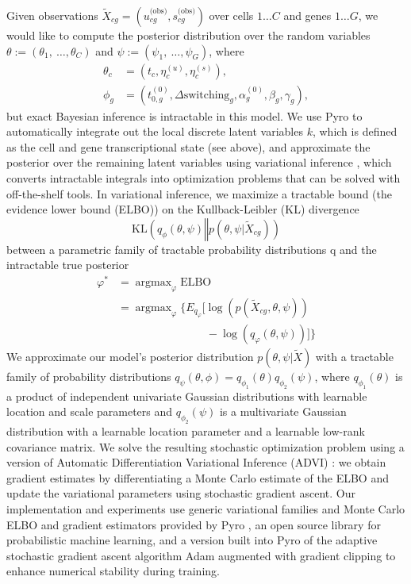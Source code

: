 \documentclass[
  sn-mathphys-num,
  lineno,
  twocolumn]{sn-jnl}
\begin{document}
Given observations
\(\tilde{X}_{cg} = \left( u_{cg}^{\text{(obs)}}, s_{cg}^{\text{(obs)}} \right)\)
over cells \(1 \dots C\) and genes \(1 \dots G\), we would like to
compute the posterior distribution over the random variables
\(\theta := \left( \theta_1, \ \dots, \theta_C \right)\) and
\(\psi := \left( \psi_1, \ \dots, \psi_G \right)\), where \begin{align}
\theta_c &= \left( t_{c}, \eta_{c}^{(u)}, \eta_{c}^{(s)} \right), \\
\phi_g &= \left( {t_{0,g}^{(0)}}, \Delta \text{switching}_{g}, 
          \alpha^{(0)}_{g}, \beta_{g}, \gamma_{g} \right),
\end{align} but exact Bayesian inference is intractable in this model.
We use Pyro to automatically integrate out the local discrete latent
variables \(k\), which is defined as the cell and gene transcriptional
state (see above), and approximate the posterior over the remaining
latent variables using variational inference
\citep{Bingham2018-id, Kucukelbir2016-bk}, which converts intractable
integrals into optimization problems that can be solved with
off-the-shelf tools. In variational inference, we maximize a tractable
bound (the evidence lower bound (ELBO)) on the Kullback-Leibler (KL)
divergence \[
\text{KL}\left( q_{\phi}(\theta, \psi) \mathrel{\Vert} 
  p(\theta, \psi \vert \tilde{X}_{cg}) \right)
\] between a parametric family of tractable probability distributions q
and the intractable true posterior \begin{align}
\varphi^* &= \operatorname{argmax}_{\varphi} \text{ELBO} \nonumber \\
&= \operatorname{argmax}_{\varphi} \bigg\{ E_{q_{\varphi}} 
     \bigg[ \log \left(p\left(\tilde{X}_{c g}, \theta, \psi \right) \right) \nonumber\\
&\qquad\qquad\qquad\qquad -\log \left(q_{\varphi}(\theta, \psi)\right) \bigg] \bigg\}
\end{align} We approximate our model's posterior distribution
\(p( \theta, \psi \vert
\tilde{X})\) with a tractable family of probability distributions
\(q_{\psi}(\theta, \phi) = q_{\phi_1}(\theta) q_{\phi_2}(\psi)\), where
\(q_{\phi_1}(\theta)\) is a product of independent univariate Gaussian
distributions with learnable location and scale parameters and
\(q_{\phi_2}(\psi)\) is a multivariate Gaussian distribution with a
learnable location parameter and a learnable low-rank covariance matrix.
We solve the resulting stochastic optimization problem using a version
of Automatic Differentiation Variational Inference (ADVI)
\citep{Kucukelbir2016-bk}: we obtain gradient estimates by
differentiating a Monte Carlo estimate of the ELBO and update the
variational parameters using stochastic gradient ascent. Our
implementation and experiments use generic variational families and
Monte Carlo ELBO and gradient estimators provided by Pyro
\citep{Bingham2018-id}, an open source library for probabilistic machine
learning, and a version built into Pyro of the adaptive stochastic
gradient ascent algorithm Adam augmented with gradient clipping to
enhance numerical stability during training.
\end{document}
